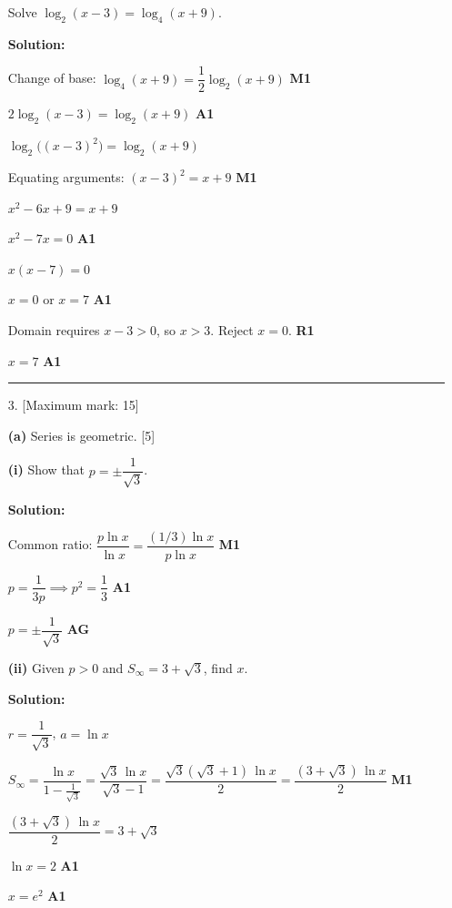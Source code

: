\documentclass[12pt, twoside]{article}
\begin{document}
\begin{enumerate}[itemsep=0.3cm]
Solve $\log_2(x - 3) = \log_4(x + 9)$.

\textbf{Solution:}

Change of base: $\log_4(x+9) = \dfrac{1}{2} \log_2(x+9)$ \hfill \textbf{M1}

$2 \log_2(x-3) = \log_2(x+9)$ \hfill \textbf{A1}

$\log_2\!\bigl((x-3)^2\bigr) = \log_2(x+9)$

Equating arguments: $(x-3)^2 = x + 9$ \hfill \textbf{M1}

$x^2 - 6x + 9 = x + 9$

$x^2 - 7x = 0$ \hfill \textbf{A1}

$x(x - 7) = 0$

$x = 0$ or $x = 7$ \hfill \textbf{A1}

Domain requires $x - 3 > 0$, so $x > 3$.
Reject $x = 0$. \hfill \textbf{R1}

$x = 7$ \hfill \textbf{A1}

\bigskip
\hrule
\bigskip

\item[3.] [Maximum mark: 15]

\medskip

\textbf{(a)} Series is geometric. \hfill [5]

\textbf{(i)} Show that $p = \pm \dfrac{1}{\sqrt{3}}$.

\textbf{Solution:}

Common ratio: $\dfrac{p \ln x}{\ln x} = \dfrac{(1/3)\ln x}{p \ln x}$ \hfill \textbf{M1}

$p = \dfrac{1}{3p} \implies p^2 = \dfrac{1}{3}$ \hfill \textbf{A1}

$p = \pm \dfrac{1}{\sqrt{3}}$ \hfill \textbf{AG}

\medskip

\textbf{(ii)} Given $p > 0$ and $S_{\infty} = 3 + \sqrt{3}$, find $x$.

\textbf{Solution:}

$r = \dfrac{1}{\sqrt{3}}$, \; $a = \ln x$

$S_{\infty} = \dfrac{\ln x}{1 - \frac{1}{\sqrt{3}}}
= \dfrac{\sqrt{3}\, \ln x}{\sqrt{3} - 1}
= \dfrac{\sqrt{3}(\sqrt{3}+1)\, \ln x}{2}
= \dfrac{(3 + \sqrt{3})\, \ln x}{2}$ \hfill \textbf{M1}

$\dfrac{(3 + \sqrt{3})\, \ln x}{2} = 3 + \sqrt{3}$

$\ln x = 2$ \hfill \textbf{A1}

$x = e^2$ \hfill \textbf{A1}


\end{enumerate}
\end{document}
